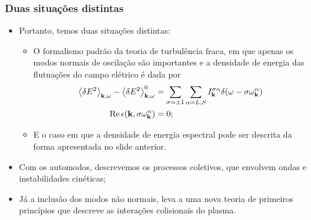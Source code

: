 \documentclass[10pt,aspectratio=1610,lualatex]{beamer}
\begin{document}
\begin{frame}
  \frametitle{Duas situações distintas}
  \begin{itemize}
    \item Portanto, temos duas situações distintas:
    \vspace{0.1cm}
    \pause
    \begin{itemize}
      \item O formalismo padrão da teoria de turbulência fraca, em que
      apenas os modos normais de oscilação são importantes e a densidade
      de energia das flutuações do campo elétrico é dada por
      \begin{equation*}
	\label{collective}
	\begin{split}
	  \left< \delta E^2 \right>_{{\bf k},\omega}
	  -\left< \delta E^2 \right>_{{\bf k},\omega}^0
	  &=\sum_{\sigma=\pm 1}\sum_{\alpha=L,S}
	  I_{\bf k}^{\sigma \alpha}
	  \delta(\omega-\sigma \omega_{\bf k}^\alpha)\\
	  \mbox{Re}\, \epsilon({\bf k},\sigma\omega_{\bf k}^\alpha)&=0;
	\end{split}
      \end{equation*}
      \vspace{-0.25cm}
      \pause
      \item E o caso em que a densidade de energia espectral pode ser
      descrita da forma apresentada no slide anterior.
    \end{itemize}
    \vspace{0.1cm}
    \pause
    \item Com os automodos, descrevemos os processos coletivos, que
    envolvem ondas e instabilidades cinéticas;
    \vspace{0.1cm}
    \pause
    \item Já a inclusão dos modos não normais, leva a uma nova teoria
    de primeiros princípios que descreve as interações colisionais do
    plasma.
  \end{itemize}
\end{frame}
\end{document}
